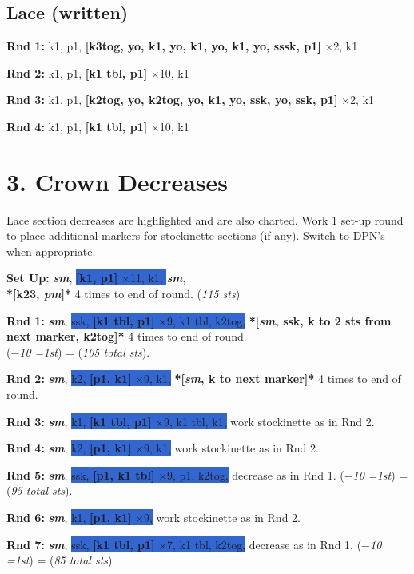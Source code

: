 \documentclass[12pt]{article}
\newcommand{\vocab}[1]{\emph{\textbf{#1}}} %
\newcommand{\rowDir}[1]{\textbf{#1:}} %
\renewcommand{\repeat}[1]{\textbf{*[#1]*}} %
\newcommand{\setrepeat}[1]{\textbf{[#1]}}		%
\newcommand{\x}{$\times$}
\newcommand{\decrease}[1]{(\emph{$-$#1
	\ifnum#1=1{st}\else{sts}\fi})}
\newcommand{\stitchcount}[1]{(\emph{#1 sts})}
\newcommand{\highlighted}[1]{\colorbox{highlight}{#1}}
\renewcommand{\pm}{\vocab{pm}} %
\newcommand{\sm}{\vocab{sm}} %
\begin{document}
\begin{multicols}{2}
\subsection*{Lace (written)}

\rowDir{Rnd 1} k1, p1, \setrepeat{k3tog, yo, k1, yo, k1, yo, k1, yo, sssk, p1} \x 2, k1

\rowDir{Rnd 2} k1, p1, \setrepeat{k1 tbl, p1} \x 10, k1

\rowDir{Rnd 3} k1, p1, \setrepeat{k2tog, yo, k2tog, yo, k1, yo, ssk, yo, ssk, p1} \x 2, k1

\rowDir{Rnd 4} k1, p1, \setrepeat{k1 tbl, p1} \x 10, k1


\columnbreak

\section*{3. Crown Decreases}

Lace section decreases are highlighted and are also charted. Work 1 set-up round to place additional markers for stockinette sections (if any). Switch to DPN's when appropriate.

\rowDir{Set Up} \sm, \highlighted{\setrepeat{k1, p1} \x 11, k1, } \sm, \\ \repeat{k23, \pm} 4 times to end of round. \stitchcount{115}

\rowDir{Rnd 1} \sm, \highlighted{ssk, \setrepeat{k1 tbl, p1} \x 9, k1 tbl, k2tog,} \repeat{\sm, ssk, k to 2 sts from next marker, k2tog} 4 times to end of round.\\  \decrease{10} = \stitchcount{105 total}.

\rowDir{Rnd 2} \sm, \highlighted{ k2, \setrepeat{p1, k1} \x 9, k1,} \repeat{\sm, k to next marker} 4 times to end of round.

\rowDir{Rnd 3} \sm, \highlighted{k1, \setrepeat{k1 tbl, p1} \x 9, k1 tbl, k1,} work stockinette as in Rnd 2.

\rowDir{Rnd 4} \sm, \highlighted{k2, \setrepeat{p1, k1} \x 9, k1,} work stockinette as in Rnd 2.

\rowDir{Rnd 5} \sm, \highlighted{ssk, \setrepeat{p1, k1 tbl} \x 9, p1, k2tog,} decrease as in Rnd 1.  \decrease{10} = \stitchcount{95 total}.

\rowDir{Rnd 6} \sm, \highlighted{k1, \setrepeat{p1, k1} \x 9,} work stockinette as in Rnd 2.

\rowDir{Rnd 7} \sm, \highlighted{ssk, \setrepeat{k1 tbl, p1} \x 7, k1 tbl, k2tog,} decrease as in Rnd 1. \decrease{10} = \stitchcount{85 total}


\end{multicols}
\end{document}
